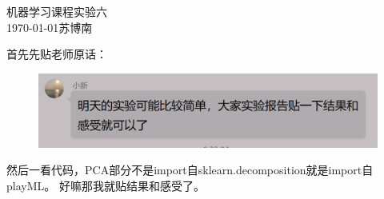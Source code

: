 \documentclass{article}
\begin{document}
\begin{center}
    \huge{机器学习课程实验六}\\
    \large{\today \quad 苏博南}
\end{center}

首先先贴老师原话：
\begin{figure}[H]
    \centering
    \includegraphics[width=\linewidth]{15.png}
\end{figure}

然后一看代码，PCA部分不是import自sklearn.decomposition就是import自playML。
好嘛那我就贴结果和感受了。
\end{document}
